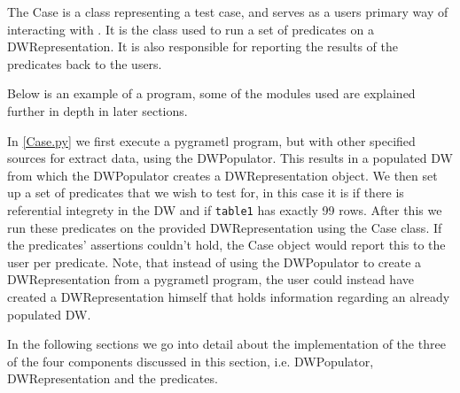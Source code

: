 The Case is a class representing a test case, and serves as a users primary way of interacting with \FW{}. It is the class used to run a set of predicates on a DWRepresentation. It is also responsible for reporting the results of the predicates back to the users.

Below is an example of a \FW{} program, some of the modules used are explained further in depth in later sections.


In \cref{Case.py} we first execute a pygrametl program, but with other specified sources for extract data, using the DWPopulator. This results in a populated DW from which the DWPopulator creates a DWRepresentation object. We then set up a set of predicates that we wish to test for, in this case it is if there is referential integrety in the DW and if \texttt{table1} has exactly 99 rows. After this we run these predicates on the provided DWRepresentation using the Case class. If the predicates' assertions couldn't hold, the Case object would report this to the user per predicate. Note, that instead of using the DWPopulator to create a DWRepresentation from a pygrametl program, the user could instead have created a DWRepresentation himself that holds information regarding an already populated DW.

In the following sections we go into detail about the implementation of the three of the four components discussed in this section, i.e. DWPopulator, DWRepresentation and the predicates.








